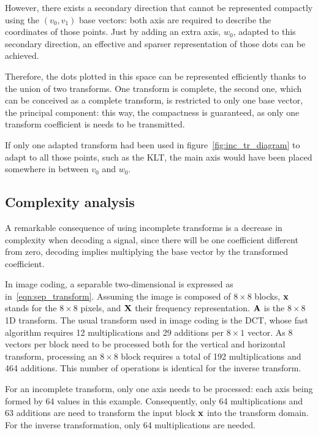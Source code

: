 \documentclass[11pt,a4paper,openright,twoside]{book}
\numberwithin{equation}{section} %
\numberwithin{figure}{section} %
\numberwithin{table}{section} %
\begin{document}
However, there exists a secondary direction that cannot be represented
compactly using the $(v_0,v_1)$ base vectors:
both axis are required to describe the coordinates of those points.
Just by adding an extra axis, $w_0$, adapted to this secondary direction, an
effective and sparser representation of those dots can be achieved.

Therefore, the dots plotted in this space can be represented efficiently thanks
to the union of two transforms.
One transform is complete, the second one, which can be conceived as a
complete transform, is restricted to only one base vector, the principal
component:
this way, the compactness is guaranteed, as only one transform coefficient is
needs to be transmitted.

If only one adapted transform had been used in figure~\ref{fig:inc_tr_diagram}
to adapt to all those points, such as the \acl{KLT}, the main axis would have
been placed somewhere in between $v_0$ and $w_0$.

\subsection{Complexity analysis}
\label{sub:it_complexity_analysis}

A remarkable consequence of using incomplete transforms is a decrease in
complexity when decoding a signal, since there will be one coefficient
different from zero, decoding implies multiplying the base vector by the
transformed coefficient.

In image coding, a separable two-dimensional is expressed as
in~\eqref{eqn:sep_transform}.
Assuming the image is composed of $8\times8$ blocks, $\mathbf{x}$ stands for the
$8\times8$ pixels, and $\mathbf{X}$ their frequency representation.
$\mathbf{A}$ is the $8\times8$ 1D transform.
The usual transform used in image coding is the \ac{DCT}, whose fast algorithm
requires 12 multiplications and 29 additions per $8\times1$ vector.
As $8$ vectors per block need to be processed both for the vertical and
horizontal transform, processing an $8\times8$ block requires a total of 192
multiplications and 464 additions.
This number of operations is identical for the inverse transform.

For an incomplete transform, only one axis needs to be processed:
each axis being formed by 64 values in this example.
Consequently, only 64 multiplications and 63 additions are need to transform
the input block $\mathbf{x}$ into the transform domain.
For the inverse transformation, only 64 multiplications are needed.
\end{document}
